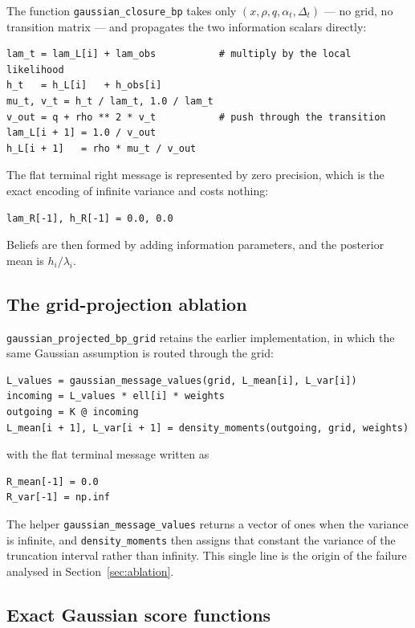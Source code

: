 \documentclass[11pt]{article}
\begin{document}
The function \texttt{gaussian\_closure\_bp} takes only \((x,\rho,q,\alpha_t,\Delta_t)\) --- no
grid, no transition matrix --- and propagates the two information scalars directly:
\begin{lstlisting}[style=pythonstyle]
lam_t = lam_L[i] + lam_obs           # multiply by the local likelihood
h_t   = h_L[i]   + h_obs[i]
mu_t, v_t = h_t / lam_t, 1.0 / lam_t
v_out = q + rho ** 2 * v_t           # push through the transition
lam_L[i + 1] = 1.0 / v_out
h_L[i + 1]   = rho * mu_t / v_out
\end{lstlisting}
The flat terminal right message is represented by zero precision, which is the exact
encoding of infinite variance and costs nothing:
\begin{lstlisting}[style=pythonstyle]
lam_R[-1], h_R[-1] = 0.0, 0.0
\end{lstlisting}
Beliefs are then formed by adding information parameters, and the posterior mean is
\(h_i/\lambda_i\).

\subsection{The grid-projection ablation}

\texttt{gaussian\_projected\_bp\_grid} retains the earlier implementation, in which the same
Gaussian assumption is routed through the grid:
\begin{lstlisting}[style=pythonstyle]
L_values = gaussian_message_values(grid, L_mean[i], L_var[i])
incoming = L_values * ell[i] * weights
outgoing = K @ incoming
L_mean[i + 1], L_var[i + 1] = density_moments(outgoing, grid, weights)
\end{lstlisting}
with the flat terminal message written as
\begin{lstlisting}[style=pythonstyle]
R_mean[-1] = 0.0
R_var[-1] = np.inf
\end{lstlisting}
The helper \texttt{gaussian\_message\_values} returns a vector of ones when the variance is
infinite, and \texttt{density\_moments} then assigns that constant the variance of the
truncation interval rather than infinity. This single line is the origin of the failure
analysed in Section~\ref{sec:ablation}.

\subsection{Exact Gaussian score functions}
\end{document}
